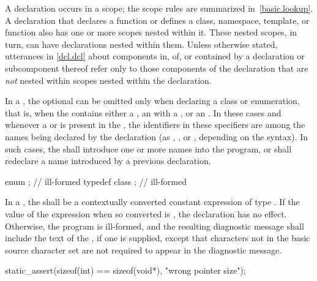 \pnum
{}%
%
A declaration occurs in a scope; the scope rules are
summarized in~\ref{basic.lookup}. A declaration that declares a function
or defines a class, namespace, template, or function also has one or
more scopes nested within it. These nested scopes, in turn, can have
declarations nested within them. Unless otherwise stated, utterances in
\ref{dcl.dcl} about components in, of, or contained by a
declaration or subcomponent thereof refer only to those components of
the declaration that are \emph{not} nested within scopes nested within
the declaration.

\pnum
{}%
%
In a , the optional
 can be omitted only when declaring a
class or enumeration, that is,
when the  contains either a
, an  with
a , or an
. In these cases and whenever a
 or  is present in
the , the identifiers in these specifiers
are among the names being declared by the declaration (as
, , or
, depending on the syntax). In such cases,
the  shall introduce one or more names into
the program, or shall redeclare a name introduced by a previous
declaration.
\begin{example}
\begin{codeblock}
enum { };           // ill-formed
typedef class { };  // ill-formed
\end{codeblock}
\end{example}

\pnum
{}%
In a , the
 shall be
a contextually converted constant expression
of type .
If the value of the expression when
so converted is , the declaration has no
effect. Otherwise, the program is ill-formed, and the resulting
diagnostic message shall include the text of
the , if one is supplied,
except that characters not in the basic
source character set are not required to appear in
the diagnostic message.
\begin{example}

\begin{codeblock}
static_assert(sizeof(int) == sizeof(void*), "wrong pointer size");
\end{codeblock}\end{example}

